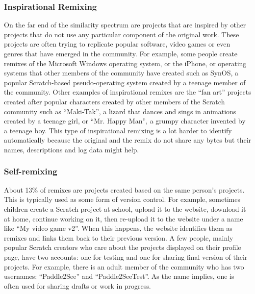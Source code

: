 \subsubsection{Inspirational Remixing}
On the far end of the similarity spectrum are projects that are inspired by other projects that do not use any particular component of the original work.
These projects are often trying to replicate popular software, video games or even genres that have emerged in the community.
For example, some people create remixes of the Microsoft Windows operating system, or the iPhone, or operating systems that other members of the community have created such as SynOS, a popular Scratch-based pseudo-operating system created by a teenage member of the community.
Other examples of inspirational remixes are the ``fan art'' projects created after popular characters created by other members of the Scratch community such as ``Maki-Tak'', a lizard that dances and sings in animations created by a teenage girl,  or  ``Mr. Happy Man'', a grumpy character invented by a teenage boy.
This type of inspirational remixing is a lot harder to identify automatically because the original and the remix do not share any bytes but their names, descriptions and log data might help. 

\subsubsection{Self-remixing}
About 13\% of remixes are projects created based on the same person's projects.
This is typically used as some form of version control.
For example, sometimes children create a Scratch project at school, upload it to the website, download it at home, continue working on it, then re-upload it to the website under a name like ``My video game v2''.
When this happens, the website identifies them as remixes and links them back to their previous version.
A few people, mainly popular Scratch creators who care about the projects displayed on their profile page, have two accounts: one for testing and one for sharing final version of their projects.
For example, there is an adult member of the community who has two usernames: ``Paddle2See'' and ``Paddle2SeeTest''.
As the name implies, one is often used for sharing drafts or work in progress.
 
